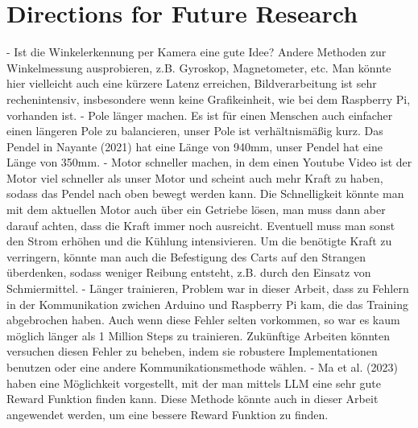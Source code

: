 \section{Directions for Future Research}
- Ist die Winkelerkennung per Kamera eine gute Idee? Andere Methoden zur Winkelmessung ausprobieren, z.B. Gyroskop, Magnetometer, etc. Man könnte hier vielleicht auch eine kürzere Latenz erreichen, Bildverarbeitung ist sehr rechenintensiv, insbesondere wenn keine Grafikeinheit, wie bei dem Raspberry Pi, vorhanden ist.
- Pole länger machen. Es ist für einen Menschen auch einfacher einen längeren Pole zu balancieren, unser Pole ist verhältnismäßig kurz. Das Pendel in Nayante (2021) hat eine Länge von 940mm, unser Pendel hat eine Länge von 350mm.
- Motor schneller machen, in dem einen Youtube Video ist der Motor viel schneller als unser Motor und scheint auch mehr Kraft zu haben, sodass das Pendel nach oben bewegt werden kann. Die Schnelligkeit könnte man mit dem aktuellen Motor auch über ein Getriebe lösen, man muss dann aber darauf achten, dass die Kraft immer noch ausreicht. Eventuell muss man sonst den Strom erhöhen und die Kühlung intensivieren. Um die benötigte Kraft zu verringern, könnte man auch die Befestigung des Carts auf den Strangen überdenken, sodass weniger Reibung entsteht, z.B. durch den Einsatz von Schmiermittel.
- Länger trainieren, Problem war in dieser Arbeit, dass zu Fehlern in der Kommunikation zwichen Arduino und Raspberry Pi kam, die das Training abgebrochen haben. Auch wenn diese Fehler selten vorkommen, so war es kaum möglich länger als 1 Million Steps zu trainieren. Zukünftige Arbeiten könnten versuchen diesen Fehler zu beheben, indem sie robustere Implementationen benutzen oder eine andere Kommunikationsmethode wählen.
- Ma et al. (2023) haben eine Möglichkeit vorgestellt, mit der man mittels LLM eine sehr gute Reward Funktion finden kann. Diese Methode könnte auch in dieser Arbeit angewendet werden, um eine bessere Reward Funktion zu finden.